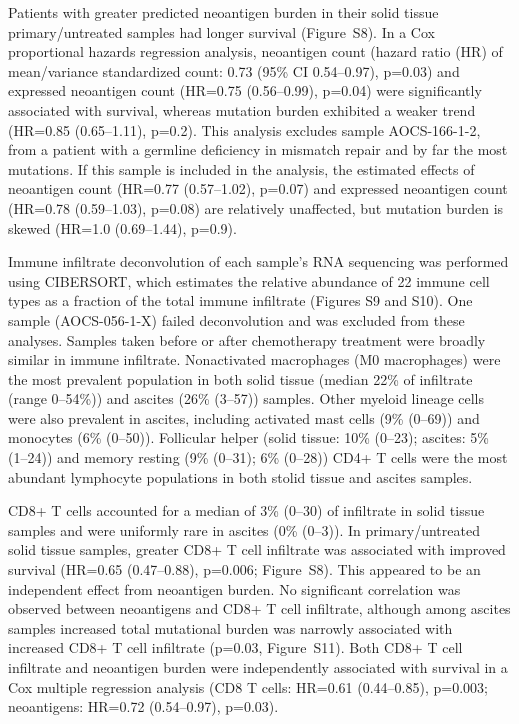 \documentclass[linenumbers]{bmcart}
\begin{document}
Patients with greater predicted neoantigen burden in their solid tissue primary/untreated samples had longer survival (Figure~S8). In a Cox proportional hazards regression analysis, neoantigen count (hazard ratio (HR) of mean/variance standardized count: 0.73 (95\% CI 0.54--0.97), p=0.03) and expressed neoantigen count (HR=0.75 (0.56--0.99), p=0.04) were significantly associated with survival, whereas mutation burden exhibited a weaker trend (HR=0.85 (0.65--1.11), p=0.2). This analysis excludes sample AOCS-166-1-2, from a patient with a germline deficiency in mismatch repair and by far the most mutations. If this sample is included in the analysis, the estimated effects of neoantigen count (HR=0.77 (0.57--1.02), p=0.07) and expressed neoantigen count (HR=0.78 (0.59--1.03), p=0.08) are relatively unaffected, but mutation burden is skewed (HR=1.0 (0.69--1.44), p=0.9).

Immune infiltrate deconvolution of each sample's RNA sequencing was performed using CIBERSORT, which estimates the relative abundance of 22 immune cell types as a fraction of the total immune infiltrate (Figures S9 and S10). One sample (AOCS-056-1-X) failed deconvolution and was excluded from these analyses. Samples taken before or after chemotherapy treatment were broadly similar in immune infiltrate. Nonactivated macrophages (M0 macrophages) were the most prevalent population in both solid tissue (median 22\% of infiltrate (range 0--54\%)) and ascites (26\% (3--57)) samples. Other myeloid lineage cells were also prevalent in ascites, including activated mast cells (9\% (0--69)) and monocytes (6\% (0--50)). Follicular helper (solid tissue: 10\% (0--23); ascites: 5\% (1--24)) and memory resting (9\% (0--31); 6\% (0--28)) CD4+ T cells were the most abundant lymphocyte populations in both stolid tissue and ascites samples.


CD8+ T cells accounted for a median of 3\% (0--30) of infiltrate in solid tissue samples and were uniformly rare in ascites (0\% (0--3)). In primary/untreated solid tissue samples, greater CD8+ T cell infiltrate was associated with improved survival (HR=0.65 (0.47--0.88), p=0.006; Figure~S8). This appeared to be an independent effect from neoantigen burden. No significant correlation was observed between neoantigens and CD8+ T cell infiltrate, although among ascites samples increased total mutational burden was narrowly associated with increased CD8+ T cell infiltrate (p=0.03, Figure~S11). Both CD8+ T cell infiltrate and neoantigen burden were independently associated with survival in a Cox multiple regression analysis (CD8 T cells: HR=0.61 (0.44--0.85), p=0.003; neoantigens: HR=0.72 (0.54--0.97), p=0.03).
\end{document}
